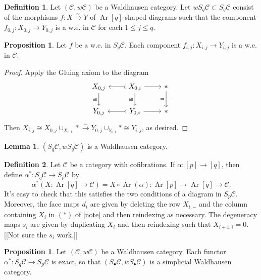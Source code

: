 \documentclass[10pt,letterpaper,cm]{nupset}
\theoremstyle{definition}
\newtheorem{definition}{Definition}
\theoremstyle{theorem}
\newtheorem{lemma}[theorem]{Lemma}
\newtheorem{prop}[theorem]{Proposition}
\theoremstyle{remark}
\newcommand{\1}{\mathbf{1}}
\renewcommand{\c}{\mathscr{C}}
\newcommand{\0}{\vec 0}
\DeclareMathOperator{\Ar}{Ar}
\begin{document}
\begin{definition}
Let $(\c, w \c)$ be a Waldhausen category. Let $w S_q\c \subset S_q \c$ consist of the morphisms $f: X \overset{\sim}{\longrightarrow} Y$ of $\Ar[q]$-shaped diagrams such that the component $f_{0, j} : X_{0, j} \to Y_{0, j}$ is a w.e. in $\c$ for each $1\leq j \leq q$.
\end{definition}

\begin{prop}
Let $f$ be a w.e. in $S_q \c$.  Each component $f_{i, j}: X_{i, j} \to Y_{i, j}$ is a w.e. in $\c$.
\end{prop}
\begin{proof}
Apply the Gluing axiom to the diagram
\[
\begin{tikzcd}
{X_{0, j}} \arrow[d, "\cong"'] & {X_{0, i}} \arrow[l, tail] \arrow[r] \arrow[d, "\cong"'] & \ast \arrow[d, "="'] \\
{Y_{0, j}} & {Y_{0, i}} \arrow[l, tail] \arrow[r] & \ast
\end{tikzcd}.
\] Then $X_{i, j} \cong X_{0, j} \cup_{X_{0, i}} \ast \overset{\sim}{\longrightarrow} Y_{0, j} \cup_{Y_{0, i}} \ast \cong Y_{i, j}$, as desired.
\end{proof}

\begin{lemma}
$(S_q \c, wS_q \c)$ is a Waldhausen category. 
\end{lemma}

\begin{definition}
Let $\c$ be a category with cofibrations. If $\alpha : [p] \to [q]$, then define $\alpha^{\ast} : S_q \c \to S_p \c$ by
$$\alpha^{\ast}(X: \Ar[q] \to \c) = X \circ \Ar(\alpha) : \Ar[p] \to \Ar[q] \to \c.$$
It's easy to check that this satisfies the two conditions of a diagram in $S_p \c$.
Moreover, the face maps $d_i$ are given by deleting the row $X_{i, -}$ and the column containing $X_i$ in $(\ast)$ of \cref{note} and then reindexing as necessary. The degeneracy maps $s_i$ are given by duplicating $X_i$ and then reindexing such that $X_{i+1, i} =0$. {[[Not sure the $s_i$ work.]]} 
\end{definition}

\begin{prop}
Let $(\c, w \c)$ be a Waldhausen category. Each functor $\alpha^{\ast}: S_q \c \to S_p \c$ is exact, so that $(S_{\bullet}\c, wS_{\bullet} \c)$ is a simplicial Waldhausen category.
\end{prop}	
\end{document}
